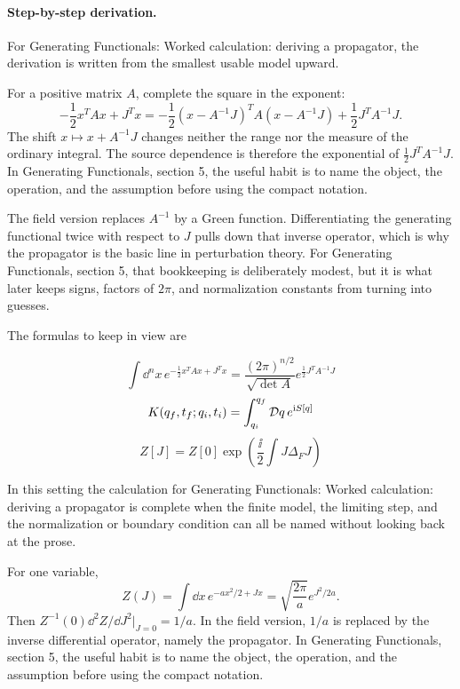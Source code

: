 \paragraph{Step-by-step derivation.}

For Generating Functionals: Worked calculation: deriving a propagator, the derivation is written from the smallest usable model upward.

For a positive matrix \(A\), complete the square in the exponent:
\[
  -\frac12x^TAx+J^Tx
  =
  -\frac12(x-A^{-1}J)^TA(x-A^{-1}J)
  +\frac12J^TA^{-1}J.
\]
The shift \(x\mapsto x+A^{-1}J\) changes neither the range nor the measure of the ordinary integral.  The source dependence is therefore the exponential of \(\frac12J^TA^{-1}J\).  In Generating Functionals, section 5, the useful habit is to name the object, the operation, and the assumption before using the compact notation.

The field version replaces \(A^{-1}\) by a Green function.  Differentiating the generating functional twice with respect to \(J\) pulls down that inverse operator, which is why the propagator is the basic line in perturbation theory.  For Generating Functionals, section 5, that bookkeeping is deliberately modest, but it is what later keeps signs, factors of \(2\pi\), and normalization constants from turning into guesses.

The formulas to keep in view are

\[
  \int\dd^n x\,e^{-\frac12x^TAx+J^Tx}=\frac{(2\pi)^{n/2}}{\sqrt{\det A}}e^{\frac12J^TA^{-1}J}
\]
\[
  K(q_f,t_f;q_i,t_i)=\int_{q_i}^{q_f}\mathcal D q\,e^{\mathrm i S[q]}
\]
\[
  Z[J]=Z[0]\exp\left(\frac{\ii}{2}\int J\Delta_FJ\right)
\]

In this setting the calculation for Generating Functionals: Worked calculation: deriving a propagator is complete when the finite model, the limiting step, and the normalization or boundary condition can all be named without looking back at the prose.




\begin{example}
For one variable,
\[
  Z(J)=\int\dd x\,e^{-ax^2/2+Jx}
  =\sqrt{\frac{2\pi}{a}}e^{J^2/2a}.
\]
Then \(Z^{-1}(0)\dd^2Z/\dd J^2|_{J=0}=1/a\).  In the field version, \(1/a\) is replaced by the inverse differential operator, namely the propagator.  In Generating Functionals, section 5, the useful habit is to name the object, the operation, and the assumption before using the compact notation.
\end{example}



